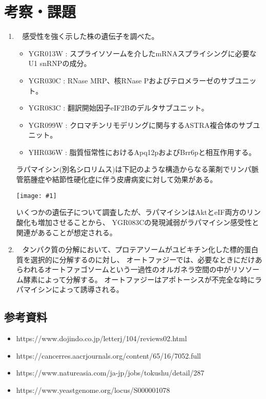 \documentclass[a4paper,papersize,dvipdfmx]{jsarticle}
\newcommand{\pict}[2]{\begin{center} \texttt{[image: \#1]} \end{center}}   %
\newcommand{\mon}[1]{\item[({#1})] \ }
\begin{document}
\section*{考察・課題}
\begin{enumerate}
\mon{1} 感受性を強く示した株の遺伝子を調べた。
\begin{itemize}
\item YGR013W : スプライソソームを介したmRNAスプライシングに必要なU1 snRNPの成分。
\item YGR030C : RNase MRP、核RNase Pおよびテロメラーゼのサブユニット。
\item YGR083C : 翻訳開始因子eIF2Bのデルタサブユニット。
\item YGR099W : クロマチンリモデリングに関与するASTRA複合体のサブユニット。
\item YHR036W : 脂質恒常性におけるApq12pおよびBrr6pと相互作用する。
\end{itemize}

ラパマイシン(別名シロリムス)は下記のような構造からなる薬剤でリンパ脈管筋腫症や結節性硬化症に伴う皮膚病変に対して効果がある。
\pict{img4/rpm.png}{5}
いくつかの遺伝子について調査したが、ラパマイシンはAktとeIF両方のリン酸化も増加させることから、
YGR083Cの発現減弱がラパマイシン感受性と関連があることが想定される。

\mon{2} タンパク質の分解において、プロテアソームがユビキチン化した標的蛋白質を選択的に分解するのに対し、
オートファジーでは、必要なときにだけあらわれるオートファゴソームという一過性のオルガネラ空間の中がリソソーム酵素によって分解する。
オートファジーはアポトーシスが不完全な時にラパマイシンによって誘導される。

\end{enumerate}

\subsection*{参考資料}
\begin{itemize}
\item https://www.dojindo.co.jp/letterj/104/reviews02.html

\item https://cancerres.aacrjournals.org/content/65/16/7052.full

\item https://www.natureasia.com/ja-jp/jobs/tokushu/detail/287

\item https://www.yeastgenome.org/locus/S000001078
\end{itemize}
\end{document}
